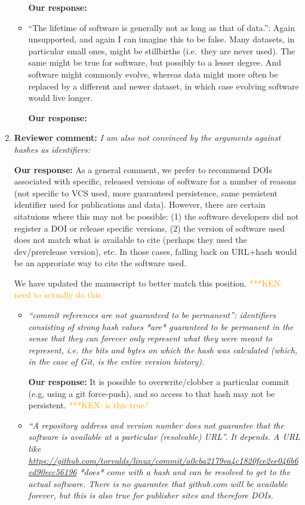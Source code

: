 \documentclass{article}
\newcommand{\niemnote}[1]{ {\textcolor{orange} { ***KEN: #1 }}} %
\begin{document}
\begin{enumerate}
\begin{itemize}
\textbf{Our response:}


\item{``The lifetime of software is generally not as long as that of data.'':
Again unsupported, and again I can imagine this to be false. Many datasets, in
particular small ones, might be stillbirths (i.e.\ they are never used). The
same might be true for software, but possibly to a lesser degree. And software
might commonly evolve, whereas data might more often be replaced by a
different and newer dataset, in which case evolving software would live
longer.}

\textbf{Our response:}


\end{itemize}

\item \textbf{Reviewer comment:}
\emph{I am also not convinced by the arguments against hashes as identifiers:}

\textbf{Our response:}
As a general comment, we prefer to recommend DOIs associated with specific,
released versions of
software for a number of reasons (not specific to VCS used, more guaranteed
persistence, same persistent identifier used for publications and data).
However, there are certain sitatuions where this may not be possible:
(1) the software developers did not register a DOI or release specific
versions, (2) the version of software used does not match what is available
to cite (perhaps they used the dev/prerelease version), etc. In those cases,
falling back on URL+hash would be an approriate way to cite the software used.

We have updated the manuscript to better match this position.
\niemnote{need to actually do this}

\begin{itemize}

\item \emph{``commit references are not guaranteed to be permanent'':
identifiers consisting of strong hash values *are* guaranteed to be permanent
in the sense that they can forever only represent what they were meant to
represent, i.e. the bits and bytes on which the hash was calculated (which, in
the case of Git, is the entire version history).}

\textbf{Our response:}
It is possible to overwrite\slash clobber a particular commit (e.g, using a
git force-push), and so access to that hash may not be persistent.\niemnote{is this true?}

\item \emph{``A repository address and version number does not guarantee that
the software is available at a particular (resolvable) URL''. It depends. A URL
like \url{https://github.com/torvalds/linux/commit/a0cba2179ea4c1820fce2ee046b6ed90ecc56196}
*does* come with a hash and can be resolved to get to the actual software.
There is no guarantee that github.com will be available forever, but this is
also true for publisher sites and therefore DOIs.}


\end{itemize}
\end{enumerate}
\end{document}
